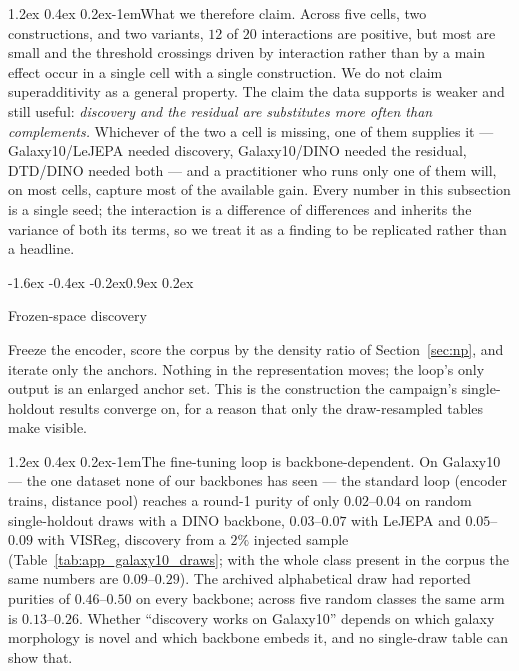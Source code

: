 \documentclass{article}
\makeatletter
\renewcommand\subsection{\@startsection{subsection}{2}{\z@}%
  {-1.6ex \@plus -0.4ex \@minus -0.2ex}{0.9ex \@plus 0.2ex}%
  {\normalsize\bf\raggedright}}
\renewcommand\paragraph{\@startsection{paragraph}{4}{\z@}%
  {1.2ex \@plus 0.4ex \@minus 0.2ex}{-1em}{\normalsize\bf}}
\makeatother
\begin{document}
\paragraph{What we therefore claim.}
Across five cells, two constructions, and two variants, $12$ of $20$
interactions are positive, but most are small and the threshold crossings
driven by interaction rather than by a main effect occur in a single cell with
a single construction. We do not claim superadditivity as a general property.
The claim the data supports is weaker and still useful: \emph{discovery and
the residual are substitutes more often than complements.} Whichever of the
two a cell is missing, one of them supplies it --- Galaxy10/LeJEPA needed
discovery, Galaxy10/DINO needed the residual, DTD/DINO needed both --- and a
practitioner who runs only one of them will, on most cells, capture most of
the available gain. Every number in this subsection is a single seed; the
interaction is a difference of differences and inherits the variance of both
its terms, so we treat it as a finding to be replicated rather than a
headline.

\subsection{Frozen-space discovery}
\label{sec:frozen}

Freeze the encoder, score the corpus by the density ratio of
Section~\ref{sec:np}, and iterate only the anchors. Nothing in the
representation moves; the loop's only output is an enlarged anchor set. This
is the construction the campaign's single-holdout results converge on, for a
reason that only the draw-resampled tables make visible.

\paragraph{The fine-tuning loop is backbone-dependent.} On Galaxy10 --- the
one dataset none of our backbones has seen --- the standard loop (encoder
trains, distance pool) reaches a round-1 purity of only $0.02$--$0.04$ on
random single-holdout draws with a DINO backbone, $0.03$--$0.07$ with LeJEPA
and $0.05$--$0.09$ with VISReg, discovery from a $2\%$ injected sample
(Table~\ref{tab:app_galaxy10_draws}; with the whole class present in the corpus
the same numbers are $0.09$--$0.29$). The archived alphabetical draw
had reported purities of $0.46$--$0.50$ on every backbone; across five random
classes the same arm is $0.13$--$0.26$. Whether ``discovery works on
Galaxy10'' depends on which galaxy morphology is novel and which backbone
embeds it, and no single-draw table can show that.
\end{document}
